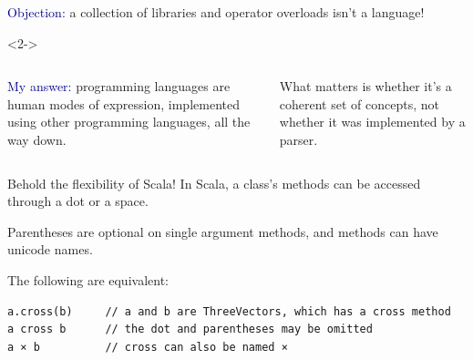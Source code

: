 \documentclass[aspectratio=169]{beamer}
\begin{document}
\begin{frame}{}
\large
\vspace{1.5 cm}
\textcolor{darkblue}{\Large Objection:} a collection of libraries and operator overloads isn't a language!

\vspace{1 cm}
\begin{uncoverenv}<2->
\begin{columns}
\textcolor{darkblue}{\Large My answer:} programming languages are human modes of expression, implemented using other programming languages, all the way down.

\vspace{0.35 cm}
What matters is whether it's a coherent set of concepts, not whether it was implemented by a parser.
\end{columns}
\end{uncoverenv}

\vspace{1 cm}
\end{frame}

\begin{frame}[fragile]{Behold the flexibility of Scala!}
\large
\vspace{0.5 cm}
In Scala, a class's methods can be accessed through a dot or a space.

\vspace{0.25 cm}
Parentheses are optional on single argument methods, and methods can have unicode names.

\vspace{0.25 cm}
The following are equivalent:

\small
\begin{verbatim}
a.cross(b)     // a and b are ThreeVectors, which has a cross method
a cross b      // the dot and parentheses may be omitted
a × b          // cross can also be named ×
\end{verbatim}
\end{frame}
\end{document}

